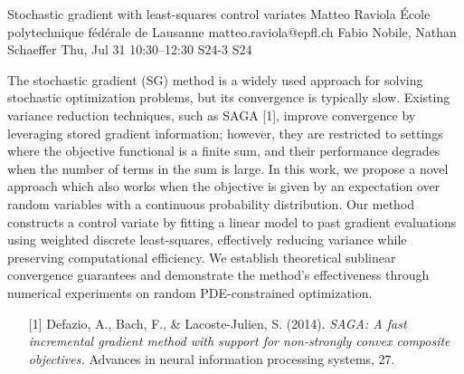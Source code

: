 \begin{talk}
  {Stochastic gradient with least-squares control variates}%
  {Matteo Raviola}%
  {École polytechnique fédérale de Lausanne}%
  {matteo.raviola@epfl.ch}%
  {Fabio Nobile, Nathan Schaeffer}%
  {}%
  {Thu, Jul 31 10:30–12:30}%
  {S24-3}%
  {S24}%
  
  
  
  The stochastic gradient (SG) method is a widely used approach for solving stochastic optimization problems, but its convergence is typically slow.
  Existing variance reduction techniques, such as SAGA [1], improve convergence by leveraging stored gradient information; however, they are restricted to settings where the objective functional is a finite sum, and their performance degrades when the number of terms in the sum is large.
  In this work, we propose a novel approach which also works when the objective is given by an expectation over random variables with a continuous probability distribution.
  Our method constructs a control variate by fitting a linear model to past gradient evaluations using weighted discrete least-squares, effectively reducing variance while preserving computational efficiency.
  We establish theoretical sublinear convergence guarantees and demonstrate the method's effectiveness through numerical experiments on random PDE-constrained optimization.
  
  \medskip
  
  \begin{enumerate}
    \item[{[1]}] Defazio, A., Bach, F., \& Lacoste-Julien, S. (2014). {\it SAGA: A fast incremental gradient method with support for non-strongly convex composite objectives.} Advances in neural information processing systems, 27.
  \end{enumerate}
  
\end{talk}


